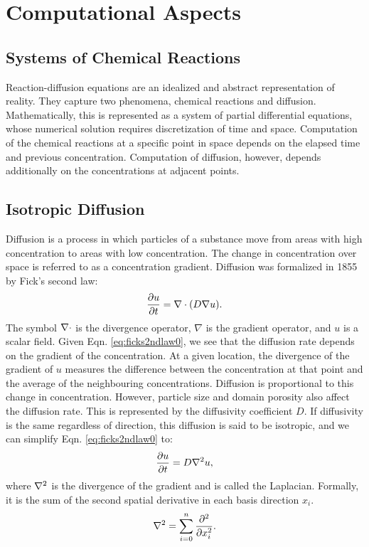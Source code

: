 \newcommand{\Morph}{u}

\chapter{Computational Aspects}
\section{Systems of Chemical Reactions}
Reaction-diffusion equations are an idealized and abstract representation of reality. They capture two phenomena, chemical reactions and diffusion. Mathematically, this is represented as a system of partial differential equations, whose numerical solution requires discretization of time and space. Computation of the chemical reactions at a specific point in space depends on the elapsed time and previous concentration. Computation of diffusion, however, depends additionally on the concentrations at adjacent points.

\section{Isotropic Diffusion}
Diffusion is a process in which particles of a substance move from areas with high concentration to areas with low concentration. The change in concentration over space is referred to as a concentration gradient. Diffusion was formalized in 1855 by Fick's second law:
\begin{equation}
\label{eq:ficks2ndlaw0}
	\frac{\partial \Morph}{\partial t} = \Div (D \nabla \Morph).
\end{equation}
The symbol $\nabla \cdot$ is the divergence operator, $\nabla$ is the gradient operator, and $\Morph$ is a scalar field. Given Eqn. \ref{eq:ficks2ndlaw0}, we see that the diffusion rate depends on the gradient of the concentration. At a given location, the divergence of the gradient of $\Morph$ measures the difference between the concentration at that point and the average of the neighbouring concentrations. Diffusion is proportional to this change in concentration. However, particle size and domain porosity also affect the diffusion rate. This is represented by the diffusivity coefficient $D$. If diffusivity is the same regardless of direction, this diffusion is said to be isotropic, and we can simplify Eqn. \ref{eq:ficks2ndlaw0} to:
\begin{equation}
\label{eq:ficks2ndlaw1}
	\frac{\partial \Morph}{\partial t} = D \Lap \Morph,
\end{equation}
where $\nabla^2$ is the divergence of the gradient and is called the Laplacian. Formally, it is the sum of the second spatial derivative in each basis direction $x_i$.
\begin{equation}
\label{eq:laplacian}
	\nabla^2 = \sum_{i=0}^{n} \frac{\partial^2}{\partial x_i^2}.
\end{equation}
	
